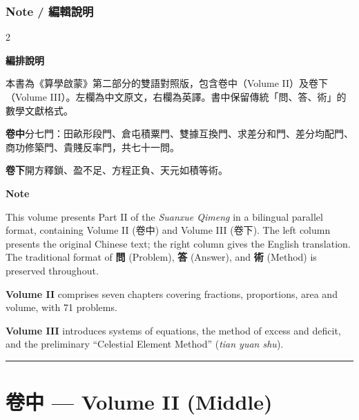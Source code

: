 \documentclass[11pt,a4paper]{article}
\newcommand{\longline}{\noindent\rule{\textwidth}{0.4pt}}
\begin{document}
\tableofcontents
\newpage

\section*{Note / 編輯說明}
\label{sec:editorial}

\begin{paracol}{2}
\begin{leftcolumn}
\noindent\textbf{編排說明}

本書為《算學啟蒙》第二部分的雙語對照版，包含卷中（Volume II）及卷下（Volume III）。左欄為中文原文，右欄為英譯。書中保留傳統「問、答、術」的數學文獻格式。

\textbf{卷中}分七門：田畝形段門、倉屯積粟門、雙據互換門、求差分和門、差分均配門、商功修築門、貴賤反率門，共七十一問。

\textbf{卷下}開方釋鎖、盈不足、方程正負、天元如積等術。
\end{leftcolumn}

\switchcolumn

\noindent\textbf{Note}

This volume presents Part II of the \textit{Suanxue Qimeng} in a bilingual parallel format, containing Volume II (\textsc{卷中}) and Volume III (\textsc{卷下}). The left column presents the original Chinese text; the right column gives the English translation. The traditional format of \textbf{問} (Problem), \textbf{答} (Answer), and \textbf{術} (Method) is preserved throughout.

\textbf{Volume II} comprises seven chapters covering fractions, proportions, area and volume, with 71 problems.

\textbf{Volume III} introduces systems of equations, the method of excess and deficit, and the preliminary ``Celestial Element Method'' (\textit{tian yuan shu}).
\end{paracol}

\vspace{1cm}
\begin{center}
\longline
\end{center}
\newpage

\part*{\color{chaptercolor}卷中 --- Volume II (Middle)}
\end{document}
